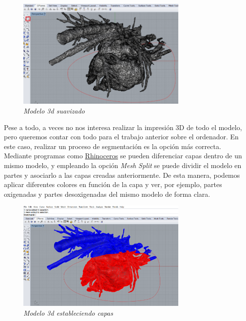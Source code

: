\documentclass[a4paper,12pt]{article}
\begin{document}
	\begin{figure}[!ht]
	\begin{center}
	  \includegraphics[width=0.75\textwidth]{Figuras/mod_03.png}
	  \caption{\emph{Modelo 3d suavizado}}
	\end{center}
	\label{fig:mod_03}
	\end{figure}

Pese a todo, a veces no nos interesa realizar la impresión 3D de todo el modelo, pero queremos contar con todo para el trabajo anterior sobre el ordenador. En este caso, realizar un proceso de segmentación es la opción más correcta. Mediante programas como \href{https://www.rhino3d.com/}{Rhinoceros} se pueden diferenciar capas dentro de un mismo modelo, y empleando la opción \emph{Mesh Split} se puede dividir el modelo en partes y asociarlo a las capas creadas anteriormente. De esta manera, podemos aplicar diferentes colores en función de la capa y ver, por ejemplo, partes oxigenadas y partes desoxigenadas del mismo modelo de forma clara.\\

	\begin{figure}[!ht]
	\begin{center}
	  \includegraphics[width=0.75\textwidth]{Figuras/mod_04.png}
	  \caption{\emph{Modelo 3d estableciendo capas}}
	\end{center}
	\label{fig:mod_04}
	\end{figure}
\end{document}
